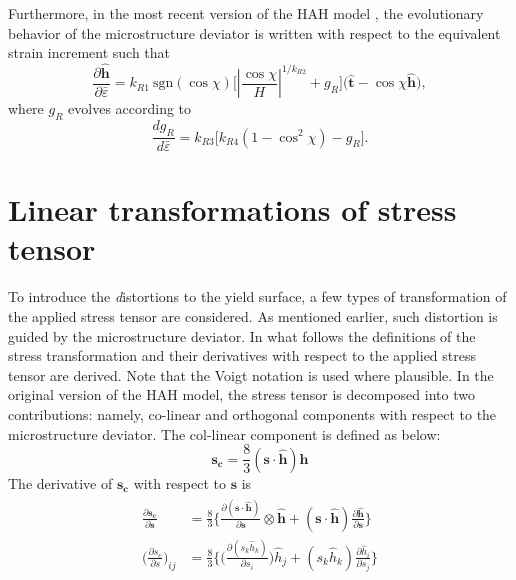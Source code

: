 \documentclass[12pt]{amsart}
\begin{document}
Furthermore, in the most recent version of the HAH model \cite{barlat2014}, the evolutionary behavior of the microstructure deviator is written with respect to the equivalent strain increment such that
\begin{equation}
  \label{eq:dmicro1}
  \frac{\partial\hat{\mathbf{h}}}{\partial \bar{\varepsilon}} = k_{R1}\ \text{sgn}(\cos\chi)\big[|\frac{\cos\chi}{H}|^{1/k_{R2}} +g_R \big] \big(\hat{\mathbf{t}}-\cos\chi \hat{\mathbf{h}}\big),
\end{equation}
where $g_R$ evolves according to
\begin{equation}
  \label{eq:dmicro2}
\frac{dg_R}{d\bar{\varepsilon}} = k_{R3} \big[k_{R4} (1-\cos^2\chi) -g_R \big].
\end{equation}
\newline
\section{Linear transformations of stress tensor}
\label{sec:stress_deriv}
To introduce the {\emph distortions} to the yield surface, a few types of transformation of the applied stress tensor are considered.
As mentioned earlier, such distortion is guided by the microstructure deviator.
In what follows the definitions of the stress transformation and their derivatives with respect to the applied stress tensor are derived.
Note that the Voigt notation is used where plausible.
\newline
In the original version of the HAH model, the stress tensor is decomposed into two contributions: namely, co-linear and orthogonal components with respect to the microstructure deviator.
The col-linear component is defined as below:
\begin{equation}
  \label{eq:decomp1}
  \mathbf{s_c} = \frac{8}{3} (\mathbf{s}\cdot\hat{\mathbf{h}}) \mathbf{h}
\end{equation}
The derivative of $\mathbf{s_c}$ with respect to $\mathbf{s}$ is
\begin{eqnarray}
  \begin{split}
  \label{eq:decomp2}
  \frac{\partial\mathbf{s_c}}{\partial\mathbf{s}} &= \frac{8}{3}\bigg\{  \frac{\partial(\mathbf{s}\cdot\hat{\mathbf{h}})}{\partial\mathbf{s}} \otimes \hat{\mathbf{h}}+ (\mathbf{s}\cdot\hat{\mathbf{h}}) \frac{\partial\hat{\mathbf{h}}}{\partial\mathbf{s}}\bigg\}\\
  \bigg( \frac{\partial s_c}{\partial s}\bigg)_{ij}&= \frac{8}{3}\Bigg\{ \bigg(\frac{\partial(s_{k}\hat{h}_{k})}{\partial s_i}\bigg)\hat{h}_j +(s_k\hat{h}_k)\frac{\partial\hat{h}_i}{\partial s_j} \Bigg\}
  \end{split}
\end{eqnarray}
\end{document}
